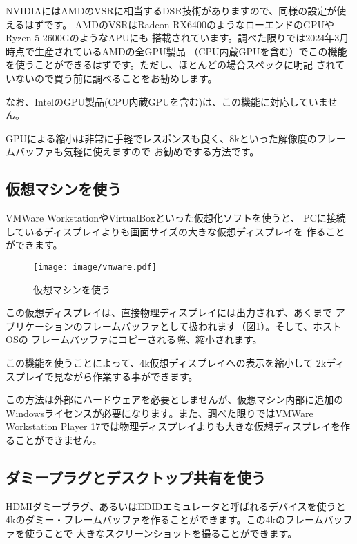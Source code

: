 NVIDIAにはAMDのVSRに相当するDSR技術がありますので、同様の設定が使えるはずです。
AMDのVSRはRadeon RX6400のようなローエンドのGPUやRyzen 5 2600GのようなAPUにも
搭載されています。調べた限りでは2024年3月時点で生産されているAMDの全GPU製品
（CPU内蔵GPUを含む）でこの機能を使うことができるはずです。ただし、ほとんどの場合スペックに明記
されていないので買う前に調べることをお勧めします。

なお、IntelのGPU製品(CPU内蔵GPUを含む)は、この機能に対応していません。

GPUによる縮小は非常に手軽でレスポンスも良く、8kといった解像度のフレームバッファも気軽に使えますので
お勧めでする方法です。

\subsection{仮想マシンを使う}
VMWare WorkstationやVirtualBoxといった仮想化ソフトを使うと、
PCに接続しているディスプレイよりも画面サイズの大きな仮想ディスプレイを
作ることができます。

\begin{figure}[btp]
  \begin{center}
    \texttt{[image: image/vmware.pdf]}
    \caption{仮想マシンを使う} \label{fig:vm}
  \end{center}
\end{figure}


この仮想ディスプレイは、直接物理ディスプレイには出力されず、あくまで
アプリケーションのフレームバッファとして扱われます（図\ref{fig:vm}）。そして、ホストOSの
フレームバッファにコピーされる際、縮小されます。

この機能を使うことによって、4k仮想ディスプレイへの表示を縮小して
2kディスプレイで見ながら作業する事ができます。

この方法は外部にハードウェアを必要としませんが、仮想マシン内部に追加の
Windowsライセンスが必要になります。また、調べた限りではVMWare Workstation
Player 17では物理ディスプレイよりも大きな仮想ディスプレイを作ることができません。



\subsection{ダミープラグとデスクトップ共有を使う}
HDMIダミープラグ、あるいはEDIDエミュレータと呼ばれるデバイスを使うと
4kのダミー・フレームバッファを作ることができます。この4kのフレームバッファを使うことで
大きなスクリーンショットを撮ることができます。

